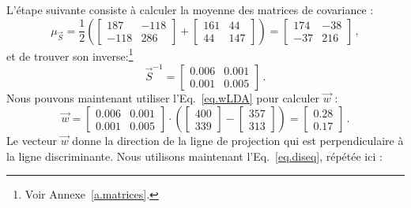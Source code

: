 L'étape suivante consiste à calculer la moyenne des matrices de covariance :
\[
\mu_{\vec{S}} = 
\frac{1}{2}\left(\left[ \begin{array}{c} 187\\-118\end{array} \begin{array}{c} -118\\286 \end{array}\right]+
\left[ \begin{array}{c} 161\\44\end{array} \begin{array}{c} 44\\147 \end{array}\right]\right) = 
\left[ \begin{array}{c} 174\\-37\end{array} \begin{array}{c} -38\\216 \end{array}\right]\,,
\]
et de trouver son inverse:\footnote{Voir Annexe~\ref{a.matrices}.}
\[
\vec{S}^{-1} = \left[ \begin{array}{c} 0.006\\0.001\end{array} \begin{array}{c} 0.001\\0.005 \end{array}\right]\,.
\]
Nous pouvons maintenant utiliser l'Eq.~\ref{eq.wLDA} pour calculer $\vec{w}$ :
\[
\vec{w} = \left[ \begin{array}{c} 0.006\\0.001\end{array} \begin{array}{c} 0.001\\0.005 \end{array}\right] \cdot \left( \left[ \begin{array}{c} 400\\339 \end{array}\right] - \left[ \begin{array}{c} 357\\313 \end{array} \right] \right) = \left[ \begin{array}{c} 0.28\\0.17 \end{array} \right]\,.
\]
Le vecteur $\vec{w}$ donne la direction de la ligne de projection qui est perpendiculaire à la ligne discriminante. Nous utilisons maintenant l'Eq.~\ref{eq.diseq}, répétée ici :

